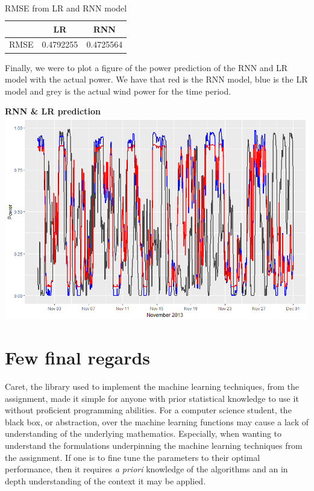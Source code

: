 \documentclass[
11pt, %
english, %
singlespacing, %
parskip, %
headsepline, %
]{report} %
\begin{document}
    
    \begin{table}[!h]
        \centering
        \begin{tabular}{|c|c|c|}
            \hline
             & LR & RNN \\
            \hline
            RMSE & 0.4792255 & 0.4725564 \\
            \hline
        \end{tabular}
        \caption{RMSE from LR and RNN model}
        \label{LR_RNN_RMSE_results}
    \end{table}
    
    Finally, we were to plot a figure of the power prediction of the RNN and LR model with the actual power. We have that red is the RNN model, blue is the LR model and grey is the actual wind power for the time period.
 
    
    \begin{center}
        \textbf{RNN \& LR prediction}\\
	    \includegraphics[scale=0.3, width=\textwidth]{figures/Rplot_RNN.png}\\[1cm]
    \end{center}

\section{Few final regards}
    Caret, the library used to implement the machine learning techniques, from the assignment, made it simple for anyone with prior statistical knowledge to use it without proficient programming abilities. For a computer science student, the black box, or abstraction, over the machine learning functions may cause a lack of understanding of the underlying mathematics. Especially, when wanting to understand the formulations underpinning the machine learning techniques from the assignment. If one is to fine tune the parameters to their optimal performance, then it requires \emph{a priori} knowledge of the algorithms and an in depth understanding of the context it may be applied.
    
\end{document}
